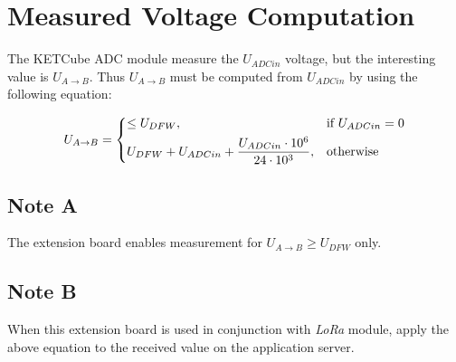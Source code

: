 
\section{Measured Voltage Computation}
  The KETCube ADC module measure the $U_{ADCin}$ voltage, but the interesting value is $U_{A \rightarrow B}$. Thus $U_{A \rightarrow B}$ must be computed from  $U_{ADCin}$ by using the following equation:
  
\[
   U_{A \rightarrow B} = 
   \begin{dcases}
     \leq U_{DFW}, & \text{if } U_{ADCin} = 0\\
     U_{DFW} + U_{ADCin} + \frac{U_{ADCin} \cdot 10^6}{24 \cdot 10^3}, & \text{otherwise}
   \end{dcases}
\]

\subsection*{Note A}
  The extension board enables measurement for $U_{A \rightarrow B} \geq U_{DFW}$ only.

\subsection*{Note B}
  When this extension board is used in conjunction with {\it LoRa} module, apply the above equation to the received value on the application server.

  

\clearpage





